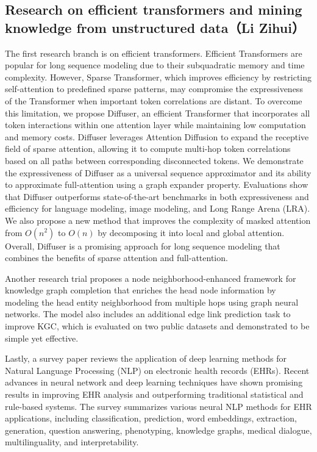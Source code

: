 \subsection{Research on efficient transformers and mining knowledge from unstructured data（Li Zihui）}

The first research branch is on efficient transformers. Efficient Transformers are popular for long sequence modeling due to their subquadratic memory and time complexity. However, Sparse Transformer, which improves efficiency by restricting self-attention to predefined sparse patterns, may compromise the expressiveness of the Transformer when important token correlations are distant. To overcome this limitation, we propose Diffuser, an efficient Transformer that incorporates all token interactions within one attention layer while maintaining low computation and memory costs. Diffuser leverages Attention Diffusion to expand the receptive field of sparse attention, allowing it to compute multi-hop token correlations based on all paths between corresponding disconnected tokens. We demonstrate the expressiveness of Diffuser as a universal sequence approximator and its ability to approximate full-attention using a graph expander property. Evaluations show that Diffuser outperforms state-of-the-art benchmarks in both expressiveness and efficiency for language modeling, image modeling, and Long Range Arena (LRA). We also propose a new method that improves the complexity of masked attention from $O(n^2)$ to $O(n)$ by decomposing it into local and global attention. Overall, Diffuser is a promising approach for long sequence modeling that combines the benefits of sparse attention and full-attention. 
\cite{feng2022diffuser}

Another research trial proposes a node neighborhood-enhanced framework for knowledge graph completion that enriches the head node information by modeling the head entity neighborhood from multiple hops using graph neural networks. The model also includes an additional edge link prediction task to improve KGC, which is evaluated on two public datasets and demonstrated to be simple yet effective. \cite{li2023nnkgc}

Lastly, a survey paper reviews the application of deep learning methods for Natural Language Processing (NLP) on electronic health records (EHRs). Recent advances in neural network and deep learning techniques have shown promising results in improving EHR analysis and outperforming traditional statistical and rule-based systems. The survey summarizes various neural NLP methods for EHR applications, including classification, prediction, word embeddings, extraction, generation, question answering, phenotyping, knowledge graphs, medical dialogue, multilinguality, and interpretability. \cite{li2022neural}

